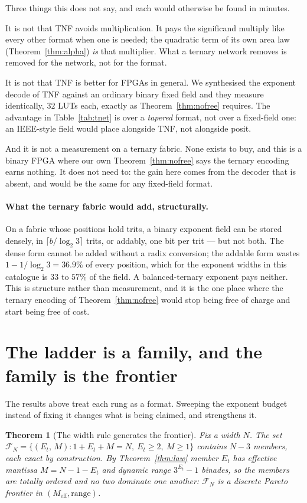 \documentclass[11pt]{article}
\newtheorem{theorem}{Theorem}
\theoremstyle{definition}
\begin{document}
Three things this does not say, and each would otherwise be found in minutes.

It is not that TNF avoids multiplication. It pays the significand multiply like
every other format when one is needed; the quadratic term of its own area law
(Theorem~\ref{thm:alpha}) \emph{is} that multiplier. What a ternary network removes
is removed for the network, not for the format.

It is not that TNF is better for FPGAs in general. We synthesised the exponent
decode of TNF against an ordinary binary fixed field and they measure identically,
$32$ LUTs each, exactly as Theorem~\ref{thm:nofree} requires. The advantage in
Table~\ref{tab:tnet} is over a \emph{tapered} format, not over a fixed-field one:
an IEEE-style field would place alongside TNF, not alongside posit.

And it is not a measurement on a ternary fabric. None exists to buy, and this is a
binary FPGA where our own Theorem~\ref{thm:nofree} says the ternary encoding earns
nothing. It does not need to: the gain here comes from the decoder that is absent,
and would be the same for any fixed-field format.

\paragraph{What the ternary fabric would add, structurally.} On a fabric whose
positions hold trits, a binary exponent field can be stored densely, in
$\lceil b/\log_2 3\rceil$ trits, or addably, one bit per trit --- but not both. The
dense form cannot be added without a radix conversion; the addable form wastes
$1 - 1/\log_2 3 = 36.9\%$ of every position, which for the exponent widths in this
catalogue is $33$ to $57\%$ of the field. A balanced-ternary exponent pays neither.
This is structure rather than measurement, and it is the one place where the
ternary encoding of Theorem~\ref{thm:nofree} would stop being free of charge and
start being free of cost.


\section{The ladder is a family, and the family is the frontier}
\label{sec:frontier}

The results above treat each rung as a format. Sweeping the exponent budget instead
of fixing it changes what is being claimed, and strengthens it.

\begin{theorem}[The width rule generates the frontier]
\label{thm:family}
Fix a width $N$. The set
$\mathcal{F}_N = \{(E_t,\, M) : 1 + E_t + M = N,\ E_t \geq 2,\ M \geq 1\}$
contains $N-3$ members, each exact by construction. By
Theorem~\ref{thm:law} member $E_t$ has effective mantissa $M = N-1-E_t$ and
dynamic range $3^{E_t}-1$ binades, so the members are totally ordered and no two
dominate one another: $\mathcal{F}_N$ is a discrete Pareto frontier in
$(M_{\mathrm{eff}}, \text{range})$.
\end{theorem}
\end{document}
